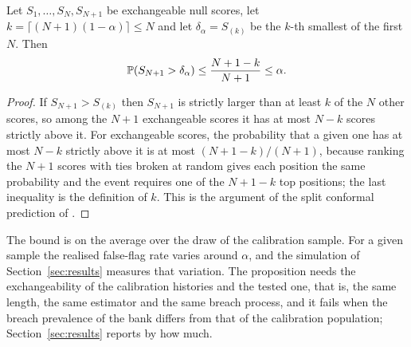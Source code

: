 \begin{proposition}
\label{prop:conformal}
Let $S_1,\dots,S_N,S_{N+1}$ be exchangeable null scores, let $k=\lceil (N+1)(1-\alpha)\rceil\le N$ and let $\delta_\alpha=S_{(k)}$ be the $k$-th smallest of the first $N$. Then
\begin{equation}
\mathbb{P}(S_{N+1}>\delta_\alpha)\le\frac{N+1-k}{N+1}\le\alpha .
\label{eq:conformal}
\end{equation}
\end{proposition}
\begin{proof}
If $S_{N+1}>S_{(k)}$ then $S_{N+1}$ is strictly larger than at least $k$ of the $N$ other scores, so among the $N+1$ exchangeable scores it has at most $N-k$ scores strictly above it. For exchangeable scores, the probability that a given one has at most $N-k$ strictly above it is at most $(N+1-k)/(N+1)$, because ranking the $N+1$ scores with ties broken at random gives each position the same probability and the event requires one of the $N+1-k$ top positions; the last inequality is the definition of $k$. This is the argument of the split conformal prediction of \citet{lei2018}.
\end{proof}
The bound is on the average over the draw of the calibration sample. For a given sample the realised false-flag rate varies around $\alpha$, and the simulation of Section~\ref{sec:results} measures that variation. The proposition needs the exchangeability of the calibration histories and the tested one, that is, the same length, the same estimator and the same breach process, and it fails when the breach prevalence of the bank differs from that of the calibration population; Section~\ref{sec:results} reports by how much.
